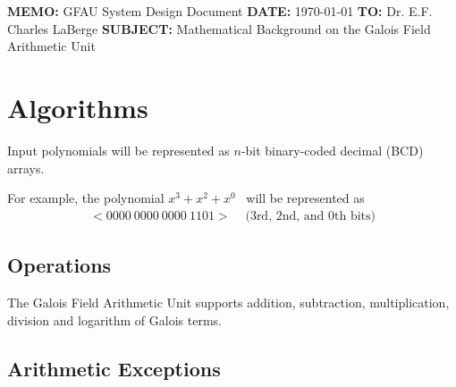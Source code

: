 \documentclass[11pt]{extarticle}
\newcommand{\examplepoly}{$x^{3}+x^{2}+x^{0}$}
\begin{document}
    \documentinfo
    {\textbf{MEMO:} GFAU System Design Document}
    {\textbf{DATE:} \today}
    {\textbf{TO:} Dr. E.F. Charles LaBerge}
    {\textbf{SUBJECT: } Mathematical Background on the Galois Field Arithmetic
    Unit}
    \vspace{-0.1in}

    

    \section{Algorithms} Input polynomials will be represented as $n$-bit
    binary-coded decimal (BCD) arrays.

    For example, the polynomial \examplepoly~ will be represented as
        \begin{equation*}
            \begin{split}
                <0000 \ 0000 \ 0000 \ 1101> & \text{  (3rd, 2nd, and 0th bits)}
            \end{split}
        \end{equation*}

        

        
        \subsection{Operations} The Galois Field Arithmetic Unit supports
        addition, subtraction, multiplication, division and logarithm of Galois
        terms.

        
        
        
        

        \subsection{Arithmetic Exceptions}

        
        

        
        
\end{document}
